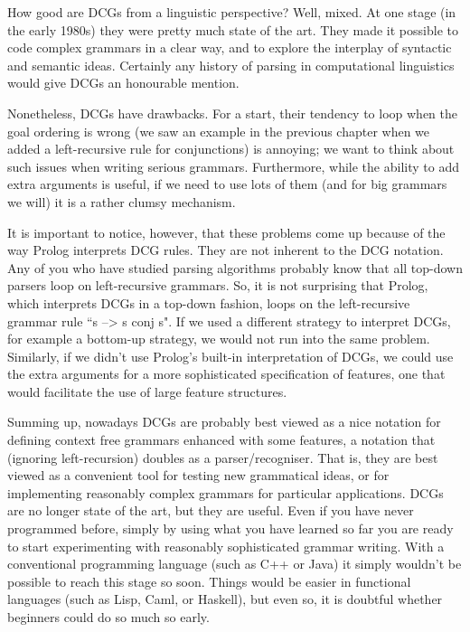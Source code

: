 How good are DCGs from a linguistic perspective?  Well, mixed.  At
one stage (in the early 1980s) they were pretty much state of the art.
They made it possible to code complex grammars in a clear way, and to
explore the interplay of syntactic and semantic ideas.  Certainly any
history of parsing in computational linguistics would give DCGs an
honourable mention.

Nonetheless, DCGs have drawbacks.  For a start, their tendency to loop
when the goal ordering is wrong (we saw an example in the previous
chapter when we added a left-recursive rule for conjunctions) is
annoying; we  want to think about such issues when
writing serious grammars. Furthermore, while the ability to add extra
arguments is useful, if we need to use lots of them (and for big
grammars we will) it is a rather clumsy mechanism.

It is important to notice, however, that these problems come up
because of the way Prolog interprets DCG rules. They are not inherent
to the DCG notation. Any of you who have studied parsing algorithms
probably know that all top-down parsers loop on left-recursive
grammars. So, it is not surprising that Prolog, which interprets DCGs
in a top-down fashion, loops on the left-recursive grammar rule
``s --> s conj s". If we used a different strategy to interpret DCGs, for
example a bottom-up strategy, we would not run into the same
problem. Similarly, if we didn't use Prolog's built-in interpretation
of DCGs, we could use the extra arguments for a more sophisticated
specification of features, one that would facilitate the use of large
feature structures.

Summing up, nowadays DCGs are probably best viewed as a nice notation
for defining context free grammars enhanced with some features, a
notation that (ignoring left-recursion) doubles as a
parser/recogniser.  That is, they are best viewed as a convenient tool
for testing new grammatical ideas, or for implementing reasonably
complex grammars for particular applications.  DCGs are no longer
state of the art, but they are useful.  Even if you have never
programmed before, simply by using what you have learned so far you
are ready to start experimenting with reasonably sophisticated grammar
writing.  With a conventional programming language (such as C++ or
Java) it simply wouldn't be possible to reach this stage so soon.
Things would be easier in functional languages (such as Lisp, Caml, or
Haskell), but even so, it is doubtful whether beginners could do so
much so early.

